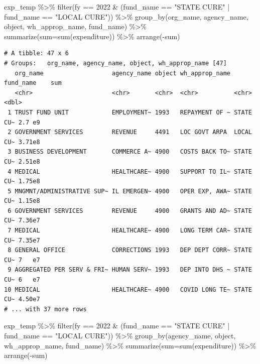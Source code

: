 \documentclass[
  letterpaper,
  DIV=11,
  numbers=noendperiod]{scrreport}
\newenvironment{Shaded}{\begin{snugshade}}{\end{snugshade}}
\newcommand{\AttributeTok}[1]{\textcolor[rgb]{0.40,0.45,0.13}{#1}}
\newcommand{\DecValTok}[1]{\textcolor[rgb]{0.68,0.00,0.00}{#1}}
\newcommand{\FunctionTok}[1]{\textcolor[rgb]{0.28,0.35,0.67}{#1}}
\newcommand{\NormalTok}[1]{\textcolor[rgb]{0.00,0.23,0.31}{#1}}
\newcommand{\SpecialCharTok}[1]{\textcolor[rgb]{0.37,0.37,0.37}{#1}}
\newcommand{\StringTok}[1]{\textcolor[rgb]{0.13,0.47,0.30}{#1}}
\begin{document}
\begin{Shaded}
\begin{Highlighting}[]
\NormalTok{exp\_temp }\SpecialCharTok{\%\textgreater{}\%} \FunctionTok{filter}\NormalTok{(fy }\SpecialCharTok{==} \DecValTok{2022} \SpecialCharTok{\&}\NormalTok{ (fund\_name }\SpecialCharTok{==} \StringTok{"STATE CURE"} \SpecialCharTok{|}\NormalTok{ fund\_name }\SpecialCharTok{==} \StringTok{"LOCAL CURE"}\NormalTok{)) }\SpecialCharTok{\%\textgreater{}\%} \FunctionTok{group\_by}\NormalTok{(org\_name, agency\_name, object, wh\_approp\_name, fund\_name) }\SpecialCharTok{\%\textgreater{}\%} \FunctionTok{summarize}\NormalTok{(}\AttributeTok{sum=}\FunctionTok{sum}\NormalTok{(expenditure)) }\SpecialCharTok{\%\textgreater{}\%} \FunctionTok{arrange}\NormalTok{(}\SpecialCharTok{{-}}\NormalTok{sum)}
\end{Highlighting}
\end{Shaded}

\begin{verbatim}
# A tibble: 47 x 6
# Groups:   org_name, agency_name, object, wh_approp_name [47]
   org_name                   agency_name object wh_approp_name fund_name    sum
   <chr>                      <chr>       <chr>  <chr>          <chr>      <dbl>
 1 TRUST FUND UNIT            EMPLOYMENT~ 1993   REPAYMENT OF ~ STATE CU~ 2.7 e9
 2 GOVERNMENT SERVICES        REVENUE     4491   LOC GOVT ARPA  LOCAL CU~ 3.71e8
 3 BUSINESS DEVELOPMENT       COMMERCE A~ 4900   COSTS BACK TO~ STATE CU~ 2.51e8
 4 MEDICAL                    HEALTHCARE~ 4900   SUPPORT TO IL~ STATE CU~ 1.75e8
 5 MNGMNT/ADMINISTRATIVE SUP~ IL EMERGEN~ 4900   OPER EXP, AWA~ STATE CU~ 1.15e8
 6 GOVERNMENT SERVICES        REVENUE     4900   GRANTS AND AD~ STATE CU~ 7.36e7
 7 MEDICAL                    HEALTHCARE~ 4900   LONG TERM CAR~ STATE CU~ 7.35e7
 8 GENERAL OFFICE             CORRECTIONS 1993   DEP DEPT CORR~ STATE CU~ 7   e7
 9 AGGREGATED PER SERV & FRI~ HUMAN SERV~ 1993   DEP INTO DHS ~ STATE CU~ 6   e7
10 MEDICAL                    HEALTHCARE~ 4900   COVID LONG TE~ STATE CU~ 4.50e7
# ... with 37 more rows
\end{verbatim}

\begin{Shaded}
\begin{Highlighting}[]
\NormalTok{exp\_temp }\SpecialCharTok{\%\textgreater{}\%} \FunctionTok{filter}\NormalTok{(fy }\SpecialCharTok{==} \DecValTok{2022} \SpecialCharTok{\&}\NormalTok{ (fund\_name }\SpecialCharTok{==} \StringTok{"STATE CURE"} \SpecialCharTok{|}\NormalTok{ fund\_name }\SpecialCharTok{==} \StringTok{"LOCAL CURE"}\NormalTok{)) }\SpecialCharTok{\%\textgreater{}\%} \FunctionTok{group\_by}\NormalTok{(agency\_name, object, wh\_approp\_name, fund\_name) }\SpecialCharTok{\%\textgreater{}\%} \FunctionTok{summarize}\NormalTok{(}\AttributeTok{sum=}\FunctionTok{sum}\NormalTok{(expenditure)) }\SpecialCharTok{\%\textgreater{}\%} \FunctionTok{arrange}\NormalTok{(}\SpecialCharTok{{-}}\NormalTok{sum)}
\end{Highlighting}
\end{Shaded}
\end{document}
